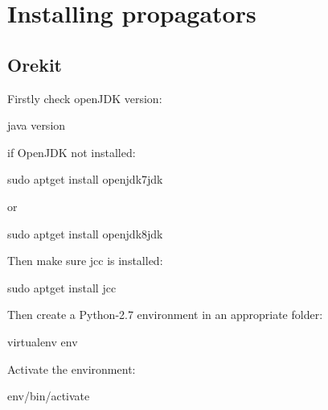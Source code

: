 \documentclass[letterpaper,10pt,english]{sphinxmanual}
\begin{document}
\chapter{Installing propagators}
\label{\detokenize{introduction/propagators:installing-propagators}}\label{\detokenize{introduction/propagators::doc}}

\section{Orekit}
\label{\detokenize{introduction/propagators:orekit}}
Firstly check openJDK version:

%
\begin{sphinxVerbatim}[commandchars=\\\{\}]
java \PYGZhy{}version
\end{sphinxVerbatim}

if OpenJDK not installed:

%
\begin{sphinxVerbatim}[commandchars=\\\{\}]
sudo apt\PYGZhy{}get install openjdk\PYGZhy{}7\PYGZhy{}jdk
\end{sphinxVerbatim}

or

%
\begin{sphinxVerbatim}[commandchars=\\\{\}]
sudo apt\PYGZhy{}get install openjdk\PYGZhy{}8\PYGZhy{}jdk
\end{sphinxVerbatim}

Then make sure jcc is installed:

%
\begin{sphinxVerbatim}[commandchars=\\\{\}]
sudo apt\PYGZhy{}get install jcc
\end{sphinxVerbatim}

Then create a Python-2.7 environment in an appropriate folder:

%
\begin{sphinxVerbatim}[commandchars=\\\{\}]
virtualenv env
\end{sphinxVerbatim}

Activate the environment:

%
\begin{sphinxVerbatim}[commandchars=\\\{\}]
 env/bin/activate
\end{sphinxVerbatim}
\end{document}
